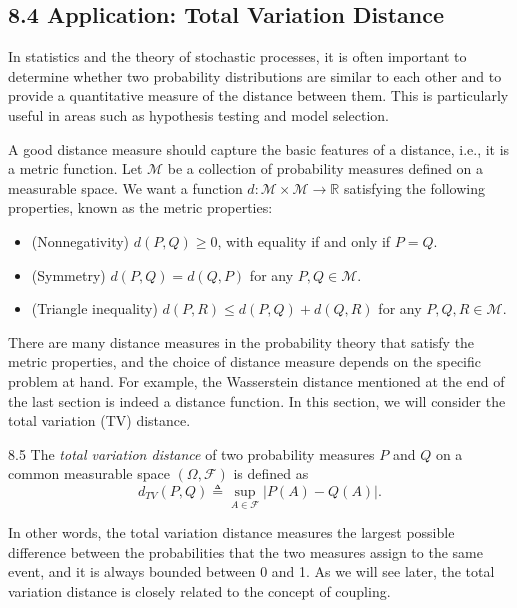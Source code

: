 \subsection*{8.4 Application: Total Variation Distance}

In statistics and the theory of stochastic processes, it is often important to determine whether two probability distributions are similar to each other and to provide a quantitative measure of the distance between them. This is particularly useful in areas such as hypothesis testing and model selection.

A good distance measure should capture the basic features of a distance, i.e., it is a metric function. Let $\mathcal{M}$ be a collection of probability measures defined on a measurable space. We want a function $d:\mathcal{M}\times \mathcal{M}\to \mathbb{R}$ satisfying the following properties, known as the metric properties:
\begin{itemize}
    \item (Nonnegativity) $d(P,Q)\ge 0$, with equality if and only if $P=Q$.
    \item (Symmetry) $d(P,Q)=d(Q,P)$ for any $P,Q\in \mathcal{M}$.
    \item (Triangle inequality) $d(P,R)\le d(P,Q)+d(Q,R)$ for any $P,Q,R\in \mathcal{M}$.
\end{itemize}

There are many distance measures in the probability theory that satisfy the metric properties, and the choice of distance measure depends on the specific problem at hand. For example, the Wasserstein distance mentioned at the end of the last section is indeed a distance function. In this section, we will consider the total variation (TV) distance.

\begin{defbox}{8.5}
The \textit{total variation distance} of two probability measures $P$ and $Q$ on a common measurable space $(\Omega,\mathcal{F})$ is defined as
\begin{equation}
d_{TV}(P,Q)\triangleq \sup_{A\in \mathcal{F}} |P(A)-Q(A)|.
\tag{8.3}
\end{equation}
\end{defbox}

In other words, the total variation distance measures the largest possible difference between the probabilities that the two measures assign to the same event, and it is always bounded between 0 and 1. As we will see later, the total variation distance is closely related to the concept of coupling.

